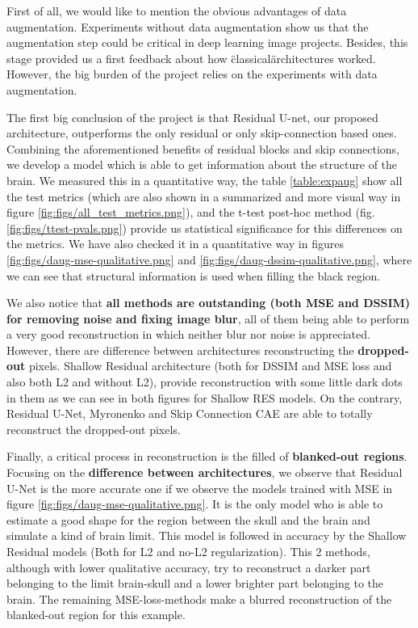 
First of all, we would like to mention the obvious advantages of data augmentation. Experiments without data augmentation show us that the augmentation step could be critical in deep learning image projects. Besides, this stage provided us a first feedback about how \"classical\" architectures worked. However, the big burden of the project relies on the experiments with data augmentation.

The first big conclusion of the project is that Residual U-net, our proposed architecture, outperforms the only residual or only skip-connection based ones. Combining the aforementioned benefits of residual blocks and skip connections, we develop a model which is able to get information about the structure of the brain. We measured this in a quantitative way, the table \ref{table:expaug} show all the test metrics (which are also shown in a summarized and more visual way in figure \ref{fig:figs/all_test_metrics.png}), and the t-test post-hoc method (fig. \ref{fig:figs/ttest-pvals.png}) provide us statistical significance for this differences on the metrics. We have also checked it in a quantitative way in figures \ref{fig:figs/daug-mse-qualitative.png} and \ref{fig:figs/daug-dssim-qualitative.png}, where we can see that structural information is used when filling the black region.

We also notice that \textbf{all methods are outstanding (both MSE and DSSIM) for removing noise and fixing image blur}, all of them being able to perform a very good reconstruction in which neither blur nor noise is appreciated. However, there are difference between architectures reconstructing the \textbf{dropped-out} pixels. Shallow Residual architecture (both for DSSIM and MSE loss and also both L2 and without L2), provide reconstruction with some little dark dots in them as we can see in both figures for Shallow RES models. On the contrary, Residual U-Net, Myronenko and Skip Connection CAE are able to totally reconstruct the dropped-out pixels. 

Finally, a critical process in reconstruction is the filled of \textbf{blanked-out regions}. Focusing on the \textbf{difference between architectures}, we observe that Residual U-Net is the more accurate one if we observe the models trained with MSE in figure \ref{fig:figs/daug-mse-qualitative.png}. It is the only model who is able to estimate a good shape for the region between the skull and the brain and simulate a kind of brain limit. This model is followed in accuracy by the Shallow Residual models (Both for L2 and no-L2 regularization). This 2 methods, although with lower qualitative accuracy, try to reconstruct a darker part belonging to the limit brain-skull and a lower brighter part belonging to the brain. The remaining MSE-loss-methods make a blurred reconstruction of the blanked-out region for this example. 

